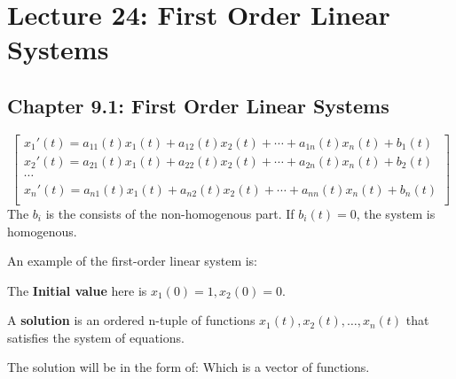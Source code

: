 \section{Lecture 24: First Order Linear Systems}


\subsection{Chapter 9.1: First Order Linear Systems}


\[
    \begin{bmatrix}
        x_1'(t) = a_{11}(t)x_1(t) + a_{12}(t)x_2(t) + \cdots + a_{1n}(t)x_n(t) + b_1(t) \\
        x_2'(t) = a_{21}(t)x_1(t) + a_{22}(t)x_2(t) + \cdots + a_{2n}(t)x_n(t) + b_2(t) \\
        \cdots \\
        x_n'(t) = a_{n1}(t)x_1(t) + a_{n2}(t)x_2(t) + \cdots + a_{nn}(t)x_n(t) + b_n(t) \\
    \end{bmatrix}
\]
The $b_i$ is the consists of the non-homogenous part.
If $b_i (t) = 0$, the system is homogenous. 



An example of the first-order linear system is:

\ex{
    \[
        x_1 ' = x_1 + 2x_2
    \]
    \[
        x_2 ' = 2x_1 + 2x_2
    \]
    \[
        x_1(0) = 1, x_2(0) = 0
    \]
}
The \textbf{Initial value} here is $x_1(0) = 1, x_2(0) = 0$.

A \textbf{solution} is an ordered n-tuple of functions $x_1(t), x_2(t), \dots, x_n(t)$ that satisfies the system of equations.

The solution will be in the form of: 
\ex{
    \[
        x_1(t) = \text{Some function}, x_2(t) = \text{Some function}
    \]
}
Which is a vector of functions. 

